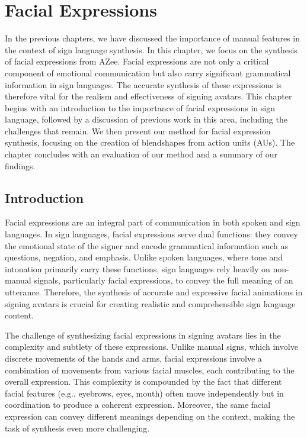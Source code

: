 \documentclass[../../main.tex]{subfiles}
\begin{document}
\chapter{Facial Expressions}

In the previous chapters, we have discussed the importance of manual features in the context of sign language synthesis. In this chapter, we focus on the synthesis of facial expressions from AZee. Facial expressions are not only a critical component of emotional communication but also carry significant grammatical information in sign languages. The accurate synthesis of these expressions is therefore vital for the realism and effectiveness of signing avatars. This chapter begins with an introduction to the importance of facial expressions in sign language, followed by a discussion of previous work in this area, including the challenges that remain. We then present our method for facial expression synthesis, focusing on the creation of blendshapes from action units (AUs). The chapter concludes with an evaluation of our method and a summary of our findings.

\section{Introduction}

Facial expressions are an integral part of communication in both spoken and sign languages. In sign languages, facial expressions serve dual functions: they convey the emotional state of the signer and encode grammatical information such as questions, negation, and emphasis. Unlike spoken languages, where tone and intonation primarily carry these functions, sign languages rely heavily on non-manual signals, particularly facial expressions, to convey the full meaning of an utterance. Therefore, the synthesis of accurate and expressive facial animations in signing avatars is crucial for creating realistic and comprehensible sign language content.

The challenge of synthesizing facial expressions in signing avatars lies in the complexity and subtlety of these expressions. Unlike manual signs, which involve discrete movements of the hands and arms, facial expressions involve a combination of movements from various facial muscles, each contributing to the overall expression. This complexity is compounded by the fact that different facial features (e.g., eyebrows, eyes, mouth) often move independently but in coordination to produce a coherent expression. Moreover, the same facial expression can convey different meanings depending on the context, making the task of synthesis even more challenging.
\end{document}
